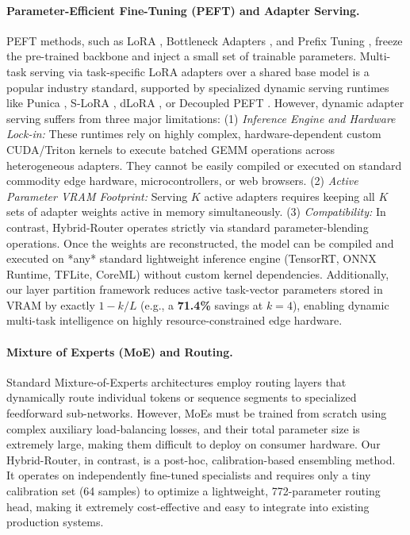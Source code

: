\paragraph{Parameter-Efficient Fine-Tuning (PEFT) and Adapter Serving.}
PEFT methods, such as LoRA \cite{hu2021lora}, Bottleneck Adapters \cite{houlsby2019parameter}, and Prefix Tuning \cite{li2021prefix}, freeze the pre-trained backbone and inject a small set of trainable parameters. Multi-task serving via task-specific LoRA adapters over a shared base model is a popular industry standard, supported by specialized dynamic serving runtimes like Punica \cite{punica}, S-LoRA \cite{slora}, dLoRA \cite{dlora}, or Decoupled PEFT \cite{decoupled_peft}. However, dynamic adapter serving suffers from three major limitations: (1) \emph{Inference Engine and Hardware Lock-in:} These runtimes rely on highly complex, hardware-dependent custom CUDA/Triton kernels to execute batched GEMM operations across heterogeneous adapters. They cannot be easily compiled or executed on standard commodity edge hardware, microcontrollers, or web browsers. (2) \emph{Active Parameter VRAM Footprint:} Serving $K$ active adapters requires keeping all $K$ sets of adapter weights active in memory simultaneously. (3) \emph{Compatibility:} In contrast, Hybrid-Router operates strictly via standard parameter-blending operations. Once the weights are reconstructed, the model can be compiled and executed on *any* standard lightweight inference engine (TensorRT, ONNX Runtime, TFLite, CoreML) without custom kernel dependencies. Additionally, our layer partition framework reduces active task-vector parameters stored in VRAM by exactly $1 - k/L$ (e.g., a \textbf{71.4\%} savings at $k=4$), enabling dynamic multi-task intelligence on highly resource-constrained edge hardware.

\paragraph{Mixture of Experts (MoE) and Routing.}
Standard Mixture-of-Experts architectures \cite{jacobs1991adaptive, shazeer2017outrageously, fedus2021switch} employ routing layers that dynamically route individual tokens or sequence segments to specialized feedforward sub-networks. However, MoEs must be trained from scratch using complex auxiliary load-balancing losses, and their total parameter size is extremely large, making them difficult to deploy on consumer hardware. Our Hybrid-Router, in contrast, is a post-hoc, calibration-based ensembling method. It operates on independently fine-tuned specialists and requires only a tiny calibration set (64 samples) to optimize a lightweight, 772-parameter routing head, making it extremely cost-effective and easy to integrate into existing production systems.
